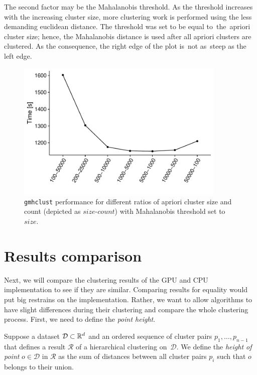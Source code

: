 The second factor may be the Mahalanobis threshold. As the threshold increases with the increasing cluster size, more clustering work is performed using the less demanding euclidean distance. The threshold was set to be equal to~the~apriori cluster size; hence, the Mahalanobis distance is used after all apriori clusters are clustered. As the consequence, the right edge of the plot is~not as~steep as the left edge.

\begin{figure}\centering
	\includegraphics[width=10cm]{img/5M-compare}
	\caption{\texttt{gmhclust} performance for different ratios of apriori cluster size and count (depicted as $size$-$count$) with Mahalanobis threshold set to $size$.}
	\label{fig04:apr_ratio}
\end{figure}

\section{Results comparison}

Next, we will compare the clustering results of the GPU and CPU implementation to see if they are similar. Comparing results for equality would put big restrains on the implementation. Rather, we want to allow algorithms to have slight differences during their clustering and compare the whole clustering process. First, we need to define the \emph{point height}.

\begin{defn}
	Suppose a dataset $\mathcal{D} \subset \mathbb{R}^d$  and an ordered sequence of cluster pairs $p_1,\dots,p_{n-1}$ that defines a result $\mathcal{R}$ of a hierarchical clustering on~$\mathcal{D}$. We define the \emph{height of point} $o \in \mathcal{D}$ in $\mathcal{R}$ as the sum of distances between all cluster pairs $p_i$ such that $o$ belongs to  their union.
\end{defn}


